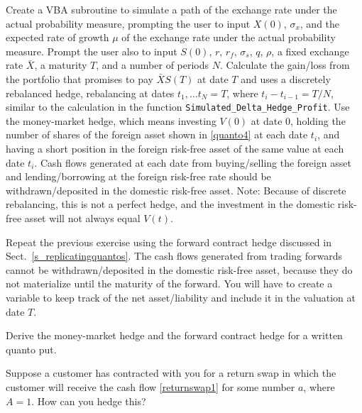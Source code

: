 \begin{prob}
\end{prob}\begin{prob} Create a VBA subroutine to simulate a path of the exchange rate under the actual probability measure, prompting the user to input $X(0)$, $\sigma_x$, and the expected rate of growth $\mu$ of the exchange rate under the actual probability measure.  Prompt the user also to input $S(0)$, $r$, $r_f$, $\sigma_s$, $q$, $\rho$, a fixed exchange rate $\bar{X}$, a maturity $T$, and a number of periods $N$.  Calculate the gain/loss from the portfolio that promises to pay $\bar{X}S(T)$ at date $T$ and uses a discretely rebalanced hedge, rebalancing at dates $t_1,\ldots t_N=T$, where $t_i-t_{i-1} = T/N$, similar to the calculation in the function \verb!Simulated_Delta_Hedge_Profit!.  Use the money-market hedge, which means investing $V(0)$ at date 0, holding the number of shares of the foreign asset shown in  \eqref{quanto4} at each date $t_i$, and having a short position in the foreign risk-free asset of the same value at each date $t_i$.  Cash flows generated at each date from buying/selling the foreign asset and lending/borrowing at the foreign risk-free rate should be withdrawn/deposited in the domestic risk-free asset.  Note: Because of discrete rebalancing, this is not a perfect hedge, and the investment in the domestic risk-free asset will not always equal $V(t)$.  
\end{prob}\begin{prob} \label{e_forwardhedging} Repeat the previous exercise using the forward contract hedge discussed in Sect.~\ref{s_replicatingquantos}.  The cash flows generated from trading forwards cannot be withdrawn/deposited in the domestic risk-free asset, because they do not materialize until the maturity of the forward.  You will have to create a variable to keep track of the net asset/liability and include it in the valuation at date $T$.
\end{prob}\begin{prob} Derive the  money-market hedge and the forward contract hedge for a written quanto put.
\end{prob}\begin{prob} Suppose a customer has contracted with you for a return swap in which the customer will receive the cash flow \eqref{returnswap1} for some number $a$, where $A=1$.  How can you hedge this?
\end{prob}